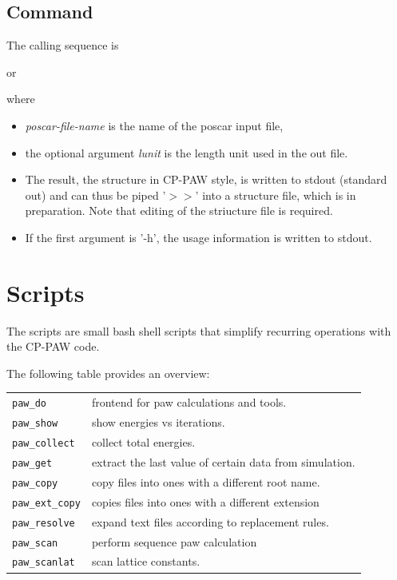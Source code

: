 \documentclass[final,12pt]{article}
\begin{document}
{{{{{{%
\subsection{Command}

The calling sequence is\bigskip

\bigskip

\noindent or\bigskip

\bigskip

\noindent
where 
\begin{itemize}
\item \textit{poscar-file-name} is the name of the poscar input file, 
\item the optional argument \textit{lunit} is the length unit used in
  the out file.
\item The result, the structure in CP-PAW style, is written to stdout
  (standard out) and can thus be piped '$>>$' into a structure file,
  which is in preparation. Note that editing of the striucture file is
  required.
\item If the first argument is '-h', the usage information is written
  to stdout.
\end{itemize}

\newpage
\section{Scripts}
The scripts are small bash shell scripts that simplify recurring operations
with the CP-PAW code. 

The following table provides an overview:\\
\begin{center}
\begin{tabular}{ll}
\verb|paw_do|      & frontend for paw calculations and tools. \\
\verb|paw_show|    & show energies vs iterations. \\
\verb|paw_collect| & collect total energies. \\
\verb|paw_get|     & extract the last value of certain data from simulation.\\
\verb|paw_copy|    & copy files into ones with a different root name.\\
\verb|paw_ext_copy|& copies files into ones with a different extension\\
\verb|paw_resolve| & expand text files according to replacement rules.\\
\verb|paw_scan|    & perform sequence paw calculation \\
\verb|paw_scanlat| & scan lattice constants. \\
\end{tabular}
\end{center}

}}}}}}
\end{document}
